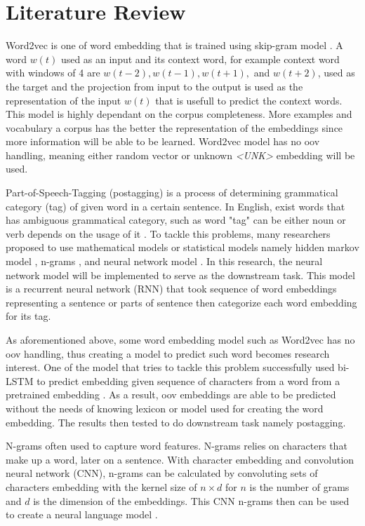 \chapter{Literature Review}
\label{chap:literature}

Word2vec is one of word embedding that is trained using skip-gram
model \citep{Distributed2013mikolov}. A word $w(t)$ used as an input
and its context word, for example context word with windows of 4 are
$w(t-2), w(t-1), w(t+1),$ and $w(t+2)$, used as the target and the
projection from input to the output is used as the representation of
the input $w(t)$ that is usefull to predict the context words. This
model is highly dependant on the corpus completeness. More examples
and vocabulary a corpus has the better the representation of the
embeddings since more information will be able to be learned. Word2vec
model has no oov handling, meaning either random vector or unknown
\textit{\textless UNK\textgreater} embedding will be used.

Part-of-Speech-Tagging (postagging) is a process of determining
grammatical category (tag) of given word in a certain sentence. In English,
exist words that has ambiguous grammatical category, such as word
"tag" can be either noun or verb depends on the usage of it
\citep{apractical1992cutting}. To tackle this problems, many
researchers proposed to use mathematical models or statistical models
namely hidden markov model \citep{apractical1992cutting}, n-grams
\citep{tnt2000Brants}, and neural network model
\citep{finding2015ling}. In this research, the neural network model
will be implemented to serve as the downstream task. This model is a
recurrent neural network (RNN) that took sequence of word embeddings
representing a sentence or parts of sentence then categorize each word
embedding for its tag.

As aforementioned above, some word embedding model such as Word2vec
has no oov handling, thus creating a model to predict such word
becomes research interest. One of the model that tries to tackle this
problem successfully used bi-LSTM to predict embedding given sequence
of characters from a word from a pretrained embedding
\citep{mimicking2017Pinter}. As a result, oov embeddings are able to
be predicted without the needs of knowing lexicon or model used for
creating the word embedding. The results then tested to do downstream
task namely postagging.

N-grams often used to capture word features. N-grams relies on
characters that make up a word, later on a sentence. With character
embedding and convolution neural network (CNN), n-grams can be calculated by
convoluting sets of characters embedding with the kernel size of $n
\times d$ for $n$ is the number of grams and $d$ is the dimension of
the embeddings. This CNN n-grams then can be used to create a neural
language model \citep{character2015kim}.